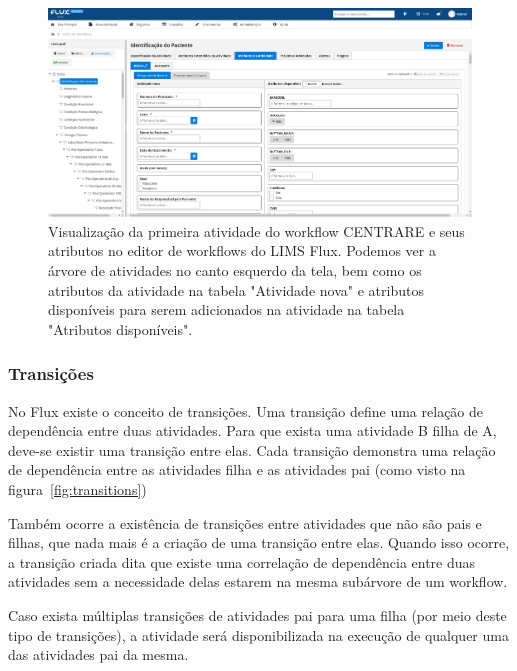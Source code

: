 \begin{figure}
    \centering
    \includegraphics[width=1\textwidth]{imgs/Flux/Workflows/Editor/editor_centrare.png}
    \caption{Visualização da primeira atividade do workflow CENTRARE e seus atributos no editor de workflows do LIMS Flux. Podemos ver a árvore de atividades no canto esquerdo da tela, bem como os atributos da atividade na tabela "Atividade nova" e atributos disponíveis para serem adicionados na atividade na tabela "Atributos disponíveis".}
    \label{fig:editor_centrare}
\end{figure}

\subsubsection{Transições} \label{sec:transitions}

No Flux existe o conceito de transições. Uma transição define uma relação de dependência entre duas atividades. Para que exista uma atividade B filha de A, deve-se existir uma transição entre elas. Cada transição demonstra uma relação de dependência entre as atividades filha e as atividades pai (como visto na figura~\ref{fig:transitions})

Também ocorre a existência de transições entre atividades que não são pais e filhas, que nada mais é a criação de uma transição entre elas. Quando isso ocorre, a transição criada dita que existe uma correlação de dependência entre duas atividades sem a necessidade delas estarem na mesma subárvore de um workflow.

Caso exista múltiplas transições de atividades pai para uma filha (por meio deste tipo de transições), a atividade será disponibilizada na execução de qualquer uma das atividades pai da mesma.

